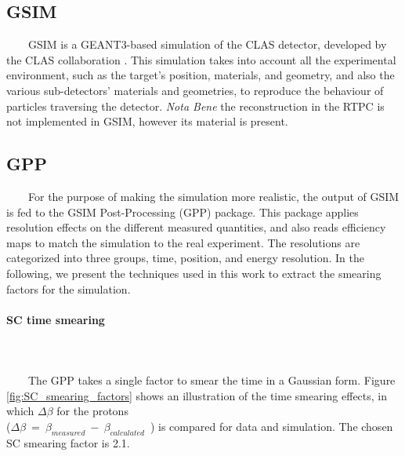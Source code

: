 \subsection{GSIM}
~~~~GSIM is a GEANT3-based simulation of the CLAS detector, developed by the CLAS collaboration \cite{GSIM}. This simulation takes into account all the experimental environment, such as the target's position, materials, and geometry, and also the various sub-detectors' materials and geometries, to reproduce the behaviour of particles traversing the detector. {\it Nota Bene} the reconstruction in the RTPC is not implemented in GSIM, however its material is present.

\subsection{GPP}
~~~~For the purpose of making the simulation more realistic, the output of GSIM is fed to the GSIM Post-Processing (GPP) package. This package applies resolution effects on the different measured quantities, and also reads efficiency maps to match the simulation to the real experiment. The resolutions are categorized into three groups, time, position, and energy resolution. In the following, we present the techniques used in this work to extract the smearing factors for the simulation.

\paragraph{SC time smearing}
~\\
~\\
~~~~The GPP takes a single factor to smear the time in a Gaussian form. Figure \ref{fig:SC_smearing_factors} shows an illustration of the time smearing effects, in which $\Delta \beta$ for the protons \\($\Delta \beta~=~\beta_{measured}~-~\beta_{calculated}$~) is compared for data and simulation. The chosen SC smearing factor is 2.1.

